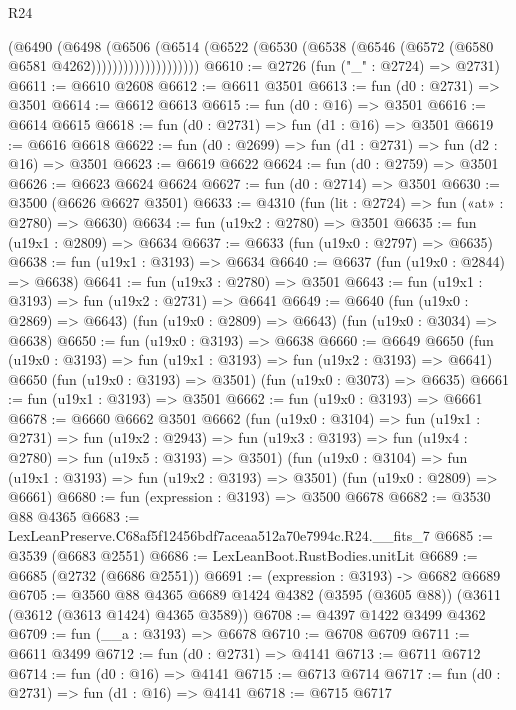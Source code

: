\begin{lexlean}{R24}
\begin{coremodule}
                        (@6490
                          (@6498
                            (@6506
                              (@6514
                                (@6522
                                  (@6530 (@6538 (@6546 (@6572 (@6580 @6581 @4262))))))))))))))))))))
@6610 := @2726 (fun ("_" : @2724) => @2731)
@6611 := @6610 @2608
@6612 := @6611 @3501
@6613 := fun (d0 : @2731) => @3501
@6614 := @6612 @6613
@6615 := fun (d0 : @16) => @3501
@6616 := @6614 @6615
@6618 := fun (d0 : @2731) => fun (d1 : @16) => @3501
@6619 := @6616 @6618
@6622 := fun (d0 : @2699) => fun (d1 : @2731) => fun (d2 : @16) => @3501
@6623 := @6619 @6622
@6624 := fun (d0 : @2759) => @3501
@6626 := @6623 @6624 @6624
@6627 := fun (d0 : @2714) => @3501
@6630 := @3500 (@6626 @6627 @3501)
@6633 := @4310 (fun (lit : @2724) => fun («at» : @2780) => @6630)
@6634 := fun (u19x2 : @2780) => @3501
@6635 := fun (u19x1 : @2809) => @6634
@6637 := @6633 (fun (u19x0 : @2797) => @6635)
@6638 := fun (u19x1 : @3193) => @6634
@6640 := @6637 (fun (u19x0 : @2844) => @6638)
@6641 := fun (u19x3 : @2780) => @3501
@6643 := fun (u19x1 : @3193) => fun (u19x2 : @2731) => @6641
@6649 := @6640
    (fun (u19x0 : @2869) => @6643)
    (fun (u19x0 : @2809) => @6643)
    (fun (u19x0 : @3034) => @6638)
@6650 := fun (u19x0 : @3193) => @6638
@6660 := @6649
    @6650
    (fun (u19x0 : @3193) => fun (u19x1 : @3193) => fun (u19x2 : @3193) => @6641)
    @6650
    (fun (u19x0 : @3193) => @3501)
    (fun (u19x0 : @3073) => @6635)
@6661 := fun (u19x1 : @3193) => @3501
@6662 := fun (u19x0 : @3193) => @6661
@6678 := @6660
    @6662
    @3501
    @6662
    (fun (u19x0 : @3104) =>
    fun (u19x1 : @2731) =>
    fun (u19x2 : @2943) =>
    fun (u19x3 : @3193) => fun (u19x4 : @2780) => fun (u19x5 : @3193) => @3501)
    (fun (u19x0 : @3104) => fun (u19x1 : @3193) => fun (u19x2 : @3193) => @3501)
    (fun (u19x0 : @2809) => @6661)
@6680 := fun (expression : @3193) => @3500 @6678
@6682 := @3530 @88 @4365
@6683 := LexLeanPreserve.C68af5f12456bdf7aceaa512a70e7994c.R24.__fits_7
@6685 := @3539 (@6683 @2551)
@6686 := LexLeanBoot.RustBodies.unitLit
@6689 := @6685 (@2732 (@6686 @2551))
@6691 := (expression : @3193) -> @6682 @6689
@6705 := @3560
    @88
    @4365
    @6689
    @1424
    @4382
    (@3595 (@3605 @88))
    (@3611 (@3612 (@3613 @1424) @4365 @3589))
@6708 := @4397 @1422 @3499 @4362
@6709 := fun (__a : @3193) => @6678
@6710 := @6708 @6709
@6711 := @6611 @3499
@6712 := fun (d0 : @2731) => @4141
@6713 := @6711 @6712
@6714 := fun (d0 : @16) => @4141
@6715 := @6713 @6714
@6717 := fun (d0 : @2731) => fun (d1 : @16) => @4141
@6718 := @6715 @6717

\end{coremodule}
\end{lexlean}
